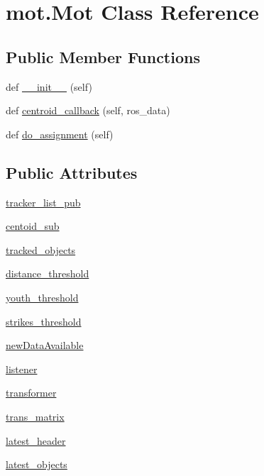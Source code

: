\hypertarget{classmot_1_1Mot}{}\section{mot.\+Mot Class Reference}
\label{classmot_1_1Mot}
\subsection*{Public Member Functions}
\begin{DoxyCompactItemize}
\item 
def \hyperlink{classmot_1_1Mot_a63d1ea755e2c380d5d8830862874b56a}{\+\_\+\+\_\+init\+\_\+\+\_\+} (self)
\item 
def \hyperlink{classmot_1_1Mot_a2f570a81beec7c5a9aedb86f586e4278}{centroid\+\_\+callback} (self, ros\+\_\+data)
\item 
def \hyperlink{classmot_1_1Mot_a146dfd7ffe29a4099dccc3cc1051e631}{do\+\_\+assignment} (self)
\end{DoxyCompactItemize}
\subsection*{Public Attributes}
\begin{DoxyCompactItemize}
\item 
\hyperlink{classmot_1_1Mot_a618159389311b0b4fab2ef8b478ea2df}{tracker\+\_\+list\+\_\+pub}
\item 
\hyperlink{classmot_1_1Mot_a806b7698802e61046a4fce8890f5c52b}{centoid\+\_\+sub}
\item 
\hyperlink{classmot_1_1Mot_a1a1a1c16afbcb4552e857568acf9ed11}{tracked\+\_\+objects}
\item 
\hyperlink{classmot_1_1Mot_a9b710d92b9f34ffeea025df93cb2bb80}{distance\+\_\+threshold}
\item 
\hyperlink{classmot_1_1Mot_ac9045d15685595e5c9c0d73a07096fd5}{youth\+\_\+threshold}
\item 
\hyperlink{classmot_1_1Mot_a4f4718be93ace6f22b7e505e50ba4422}{strikes\+\_\+threshold}
\item 
\hyperlink{classmot_1_1Mot_a09b9273b0c9ac16aca96e09a9a8286ee}{new\+Data\+Available}
\item 
\hyperlink{classmot_1_1Mot_a5d3db20cb3944a6b4206b2c2cabb8c25}{listener}
\item 
\hyperlink{classmot_1_1Mot_ac1213e59910aae6fed426abb8debee7e}{transformer}
\item 
\hyperlink{classmot_1_1Mot_a5224b869eed96f5fb233eb19b7a5dee2}{trans\+\_\+matrix}
\item 
\hyperlink{classmot_1_1Mot_a0454aadfd7e1cfba0ac43bbd57052758}{latest\+\_\+header}
\item 
\hyperlink{classmot_1_1Mot_a7a40f92ea70acf4200484294185a8759}{latest\+\_\+objects}
\end{DoxyCompactItemize}
